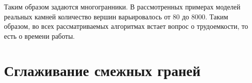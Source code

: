 \documentclass[a4paper,12pt, titlepage]{article}
\begin{document}
\begin{flushleft}
 Таким образом задаются многогранники. В рассмотренных примерах моделей реальных камней количество
вершин варьировалось от 80 до 8000. Таким образом, во всех рассматриваемых алгоритмах встает вопрос о 
трудоемкости, то есть о времени работы.
\end{flushleft}

\section{Сглаживание смежных граней}
\end{document}
